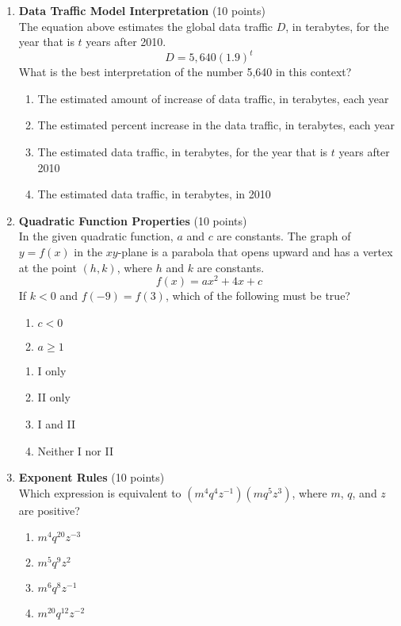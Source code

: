 \begin{enumerate}
  \newpage

  \item \textbf{Data Traffic Model Interpretation} (10 points)\\
  The equation above estimates the global data traffic $D$, in terabytes, for the year that is $t$ years after 2010.
  \[
  D=5,640(1.9)^{t}
  \]
  What is the best interpretation of the number 5,640 in this context?
  \begin{enumerate}[label=(\Alph*)]
    \item The estimated amount of increase of data traffic, in terabytes, each year
    \item The estimated percent increase in the data traffic, in terabytes, each year
    \item The estimated data traffic, in terabytes, for the year that is $t$ years after 2010
    \item The estimated data traffic, in terabytes, in 2010
  \end{enumerate}
  \begin{subanswer}
  \end{subanswer}

  \item \textbf{Quadratic Function Properties} (10 points)\\
  In the given quadratic function, $a$ and $c$ are constants. The graph of $y=f(x)$ in the $xy$-plane is a parabola that opens upward and has a vertex at the point $(h, k)$, where $h$ and $k$ are constants.
  \[
  f(x)=a x^{2}+4 x+c
  \]
  If $k<0$ and $f(-9)=f(3)$, which of the following must be true?
  \begin{enumerate}[label=(\Roman*)]
    \item $c<0$
    \item $a \geq 1$
  \end{enumerate}
  \begin{enumerate}[label=(\Alph*)]
    \item I only
    \item II only
    \item I and II
    \item Neither I nor II
  \end{enumerate}
  \begin{subanswer}
  \end{subanswer}

  \item \textbf{Exponent Rules} (10 points)\\
  Which expression is equivalent to $\left(m^{4} q^{4} z^{-1}\right)\left(m q^{5} z^{3}\right)$, where $m$, $q$, and $z$ are positive?
  \begin{enumerate}[label=(\Alph*)]
    \item $m^{4} q^{20} z^{-3}$
    \item $m^{5} q^{9} z^{2}$
    \item $m^{6} q^{8} z^{-1}$
    \item $m^{20} q^{12} z^{-2}$
  \end{enumerate}
  \begin{subanswer}
  \end{subanswer}


\end{enumerate}
